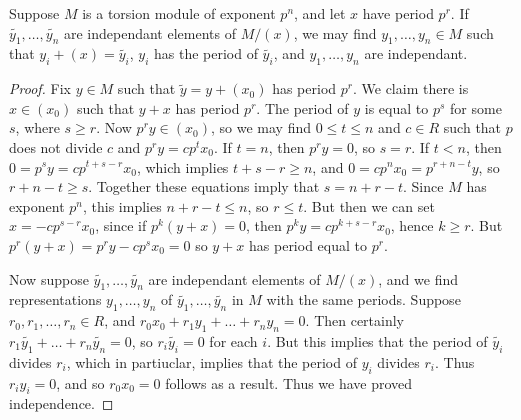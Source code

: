 \begin{lemma}
    Suppose $M$ is a torsion module of exponent $p^n$, and let $x$ have period $p^r$. If $\tilde{y_1},\dots, \tilde{y_n}$ are independant elements of $M/(x)$, we may find $y_1,\dots, y_n \in M$ such that $y_i + (x) = \tilde{y_i}$, $y_i$ has the period of $\tilde{y_i}$, and $y_1,\dots, y_n$ are independant.
\end{lemma}
\begin{proof}
    Fix $y \in M$ such that $\tilde{y} = y + (x_0)$ has period $p^r$. We claim there is $x \in (x_0)$ such that $y + x$ has period $p^r$. The period of $y$ is equal to $p^s$ for some $s$, where $s \geq r$. Now $p^r y \in (x_0)$, so we may find $0 \leq t \leq n$ and $c \in R$ such that $p$ does not divide $c$ and $p^r y = c p^t x_0$. If $t = n$, then $p^r y = 0$, so $s = r$. If $t < n$, then $0 = p^s y = c p^{t+s-r} x_0$, which implies $t+s-r \geq n$, and $0 = c p^n x_0 = p^{r+n-t} y$, so $r+n-t \geq s$. Together these equations imply that $s=n+r-t$. Since $M$ has exponent $p^n$, this implies $n+r-t \leq n$, so $r \leq t$. But then we can set $x = - c p^{s-r} x_0$, since if $p^k(y + x) = 0$, then $p^k y = c p^{k+s-r} x_0$, hence $k \geq r$. But $p^r(y+x) = p^r y - c p^s x_0 = 0$ so $y+x$ has period equal to $p^r$.

    Now suppose $\tilde{y_1}, \dots, \tilde{y_n}$ are independant elements of $M/(x)$, and we find representations $y_1,\dots,y_n$ of $\tilde{y_1},\dots,\tilde{y_n}$ in $M$ with the same periods. Suppose $r_0,r_1,\dots,r_n \in R$, and $r_0x_0 + r_1 y_1 + \dots + r_ny_n = 0$. Then certainly $r_1\tilde{y_1} + \dots + r_n \tilde{y_n} = 0$, so $r_i \tilde{y_i} = 0$ for each $i$. But this implies that the period of $\tilde{y_i}$ divides $r_i$, which in partiuclar, implies that the period of $y_i$ divides $r_i$. Thus $r_iy_i = 0$, and so $r_0x_0 = 0$ follows as a result. Thus we have proved independence.
\end{proof}


